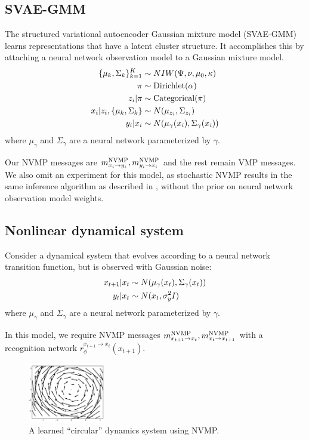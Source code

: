 \subsection{SVAE-GMM}
The structured variational autoencoder Gaussian mixture model (SVAE-GMM) \cite{svae} learns representations
that have a latent cluster structure.
It accomplishes this by attaching a neural network observation model
to a Gaussian mixture model.
\begin{align*}
    \{\mu_k, \Sigma_k\}_{k = 1}^K &\sim NIW(\Psi, \nu, \mu_0, \kappa) \\
    \pi &\sim \text{Dirichlet}(\alpha) \\
    z_i | \pi &\sim \text{Categorical}(\pi) \\
    x_i | z_i, \{\mu_k, \Sigma_k\} &\sim N(\mu_{z_i}, \Sigma_{z_i}) \\
    y_i | x_i &\sim N(\mu_\gamma(x_i), \Sigma_\gamma(x_i))
\end{align*}
where $\mu_\gamma$ and $\Sigma_\gamma$ are a neural network parameterized by $\gamma$.

Our NVMP messages are $m^{\text{NVMP}}_{x_i \rightarrow y_i}, m^{\text{NVMP}}_{y_i \rightarrow x_i}$
and the rest remain VMP messages. We also omit an experiment
for this model, as stochastic NVMP
results in the same inference algorithm as described in \cite{svae},
without the prior on neural network observation model weights.

\subsection{Nonlinear dynamical system}
Consider a dynamical system that evolves
according to a neural
network transition function, but is observed with Gaussian noise:
\begin{align*}
    x_{t + 1} | x_t &\sim N(\mu_\gamma(x_t), \Sigma_\gamma(x_t)) \\
    y_t | x_t &\sim N(x_t, \sigma^2_yI)
\end{align*}
where $\mu_\gamma$ and $\Sigma_\gamma$ are a neural network parameterized by $\gamma$.

In this model, we require NVMP messages $m^{\text{NVMP}}_{x_{t + 1} \rightarrow x_t}, m^{\text{NVMP}}_{x_t \rightarrow x_{t + 1}}$ with a recognition network $r^{x_{t + 1} \rightarrow x_t}_\phi(x_{t + 1})$.

\begin{figure}
    \centering
    \includegraphics[width=0.3\textwidth]{img/nvmp/nlds}
    \caption{A learned ``circular'' dynamics system using NVMP.}
    \label{fig:nlds}
\end{figure}

